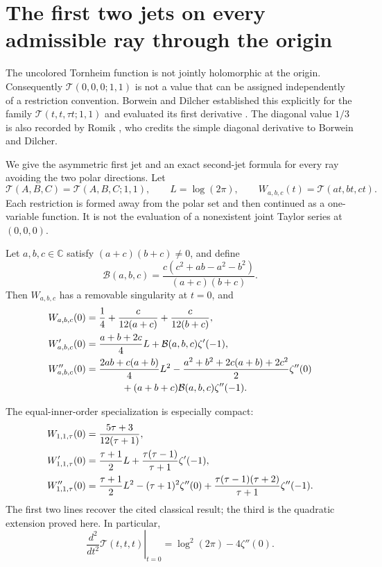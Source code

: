 \section{The first two jets on every admissible ray through the origin}
\label{sp:sec:rays}

The uncolored Tornheim function is not jointly holomorphic at the
origin.  Consequently $\mathcal T(0,0,0;1,1)$ is not a value that can
be assigned independently of a restriction convention.  Borwein and
Dilcher established this explicitly for the family
$\mathcal T(t,t,\tau t;1,1)$ and evaluated its first derivative
\cite[Theorems 2.7 and 3.1]{BorweinDilcher}.  The diagonal value $1/3$ is also
recorded by Romik \cite[Theorem 1.3]{sp:Romik}, who credits the simple
diagonal derivative to Borwein and Dilcher.

We give the asymmetric first jet and an exact second-jet formula for
every ray avoiding the two polar directions.  Let
\[
 \mathcal T(A,B,C)=\mathcal T(A,B,C;1,1),\qquad L=\log(2\pi),
 \qquad W_{a,b,c}(t)=\mathcal T(at,bt,ct).
\]
Each restriction is formed away from the polar set and then continued
as a one-variable function.  It is not the evaluation of a nonexistent
joint Taylor series at $(0,0,0)$.

\begin{theorem}
\label{sp:raytheorem}
Let $a,b,c\in\mathbb C$ satisfy $(a+c)(b+c)\ne0$, and define
\begin{equation}\label{sp:rayB}
 \mathcal B(a,b,c)
 =\frac{c(c^2+ab-a^2-b^2)}{(a+c)(b+c)}.
\end{equation}
Then $W_{a,b,c}$ has a removable singularity at $t=0$, and
\begin{align}
 W_{a,b,c}(0)
   &=\frac14+\frac{c}{12(a+c)}+\frac{c}{12(b+c)},
       \label{sp:ray0}\\
 W_{a,b,c}'(0)
   &=\frac{a+b+2c}{4}L+\mathcal B(a,b,c)\zeta'(-1),
       \label{sp:ray1}\\
 W_{a,b,c}''(0)
   &=\frac{2ab+c(a+b)}4L^2
      -\frac{a^2+b^2+2c(a+b)+2c^2}{2}\zeta''(0)\notag\\
   &\hspace{13mm}+(a+b+c)\mathcal B(a,b,c)\zeta''(-1).
       \label{sp:ray2}
\end{align}
\end{theorem}

The equal-inner-order specialization is especially compact:
\begin{align}
 W_{1,1,\tau}(0)&=\frac{5\tau+3}{12(\tau+1)},\notag\\
 W_{1,1,\tau}'(0)&=\frac{\tau+1}{2}L
             +\frac{\tau(\tau-1)}{\tau+1}\zeta'(-1),\notag\\
 W_{1,1,\tau}''(0)&=\frac{\tau+1}{2}L^2
             -(\tau+1)^2\zeta''(0)
             +\frac{\tau(\tau-1)(\tau+2)}{\tau+1}\zeta''(-1).
 \label{sp:equalray}
\end{align}
The first two lines recover the cited classical result; the third is
the quadratic extension proved here.  In particular,
\begin{equation}\label{sp:diagonal2}
 \left.\frac{d^2}{dt^2}\mathcal T(t,t,t)\right|_{t=0}
    =\log^2(2\pi)-4\zeta''(0).
\end{equation}

